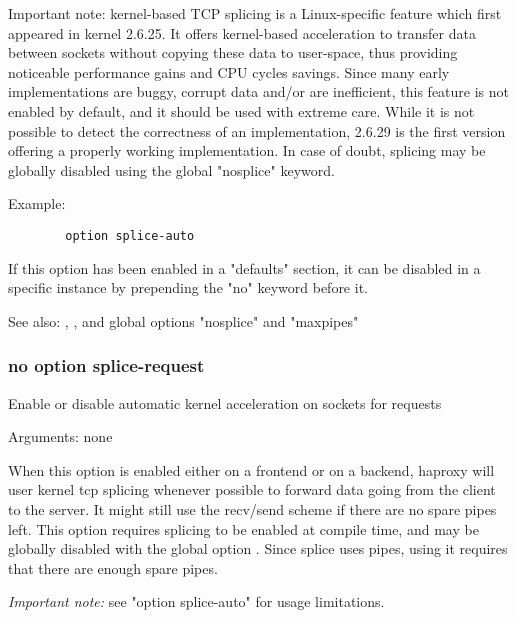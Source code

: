   Important note: kernel-based TCP splicing is a Linux-specific feature which
  first appeared in kernel 2.6.25. It offers kernel-based acceleration to
  transfer data between sockets without copying these data to user-space, thus
  providing noticeable performance gains and CPU cycles savings. Since many
  early implementations are buggy, corrupt data and/or are inefficient, this
  feature is not enabled by default, and it should be used with extreme care.
  While it is not possible to detect the correctness of an implementation,
  2.6.29 is the first version offering a properly working implementation. In
  case of doubt, splicing may be globally disabled using the global "nosplice"
  keyword.

  Example:
  \begin{verbatim}
        option splice-auto
  \end{verbatim}

  If this option has been enabled in a "defaults" section, it can be disabled
  in a specific instance by prepending the "no" keyword before it.


See also: , , and global
             options "nosplice" and "maxpipes"

\subsubsection[splice-request]{}
\subsubsection*{no option splice-request}


  Enable or disable automatic kernel acceleration on sockets for requests


  Arguments: none

  When this option is enabled either on a frontend or on a backend, haproxy
  will user kernel tcp splicing whenever possible to forward data going from
  the client to the server. It might still use the recv/send scheme if there
  are no spare pipes left. This option requires splicing to be enabled at
  compile time, and may be globally disabled with the global option .
  Since splice uses pipes, using it requires that there are enough spare pipes.

  \emph{Important note:} see "option splice-auto" for usage limitations.

